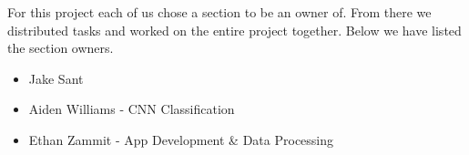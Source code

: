 For this project each of us chose a section to be an owner of.
From there we distributed tasks and worked on the entire project together.
Below we have listed the section owners.

\begin{itemize}

    \item Jake Sant

    \item Aiden Williams - CNN Classification

    \item Ethan Zammit - App Development \& Data Processing

\end{itemize}
